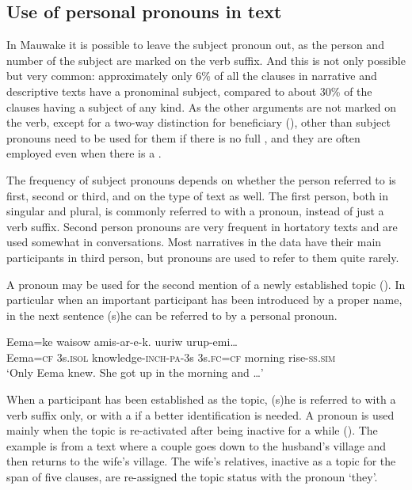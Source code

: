 \subsection{Use of personal pronouns in text}\label{sec:3.5.11}
{}
In Mauwake it is possible to leave the subject pronoun out, as the person and number of the subject are marked on the verb suffix. And this is not only possible but very common: approximately only 6\% of all the clauses in narrative and descriptive texts have a pronominal subject, compared to about 30\% of the clauses having a subject  of any kind. As the other arguments are not marked on the verb, except for a two-way distinction for beneficiary (), other than subject pronouns need to be used for them if there is no full , and they are often employed even when there is a .

The frequency of subject pronouns depends on whether the person referred to is first, second or third, and on the type of text as well. The first person, both in singular and plural, is commonly referred to with a pronoun, instead of just a verb suffix. Second person pronouns are very frequent in hortatory texts and are used somewhat in conversations. Most narratives in the data have their main participants in third person, but pronouns are used to refer to them quite rarely. 

A pronoun may be used for the second mention of a newly established topic (). In particular when an important participant has been introduced by a proper name, in the next sentence (s)he can be referred to by a personal pronoun. 

\ea%
\label{ex:3:x1867}
\gll Eema=ke waisow amis-ar-e-k.  uuriw urup-emi{\dots}\\
Eema=\textsc{cf} 3s.\textsc{isol} knowledge-\textsc{inch}-\textsc{pa}-3s 3s.\textsc{fc}=\textsc{cf} morning rise-\textsc{ss}.\textsc{sim}\\
\glt`Only Eema knew. She got up in the morning and {\dots}'
\z

When a participant has been established as the topic, (s)he is referred to with a verb suffix only, or with a  if a better identification is needed. A pronoun is used mainly when the topic is re-activated after being inactive for a while (). The example  is from a text where a couple goes down to the husband's village and then returns to the wife's village. The wife's relatives, inactive as a topic for the span of five clauses, are re-assigned the topic status with the pronoun  `they'. 

